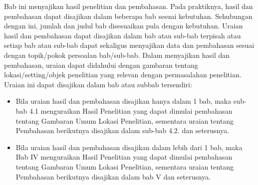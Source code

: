 Bab ini menyajikan hasil penelitian dan pembahasan. Pada praktiknya, hasil dan pembahasan dapat disajikan dalam beberapa bab sesuai kebutuhan. Sehubungan dengan ini, jumlah dan judul bab disesuaikan pula dengan kebutuhan. Uraian hasil dan pembahasan dapat disajikan dalam bab atau sub-bab terpisah atau setiap bab atau sub-bab dapat sekaligus menyajikan data dan pembahasan sesuai dengan topik/pokok persoalan bab/sub-bab. Dalam menyajikan hasil dan pembahasan, uraian dapat didahului dengan gambaran tentang lokasi/setting/objek penelitian yang relevan dengan permasalahan penelitian. Uraian ini dapat disajikan dalam bab atau subbab tersendiri:
\begin{itemize}
    \item Bila uraian hasil dan pembahasan disajikan hanya dalam 1 bab, maka sub-bab 4.1 menguraikan Hasil Penelitian yang dapat dimulai pembahasan tentang Gambaran Umum Lokasi Penelitian, sementara uraian tentang Pembahasan berikutnya disajikan dalam sub-bab 4.2. dan seterusnya.
    \item Bila uraian hasil dan pembahasan disajikan dalam lebih dari 1 bab, maka Bab IV menguraikan Hasil Penelitian yang dapat dimulai pembahasan tentang Gambaran Umum Lokasi Penelitian, sementara uraian tentang Pembahasan berikutnya disajikan dalam bab V dan seterusnya.
\end{itemize}